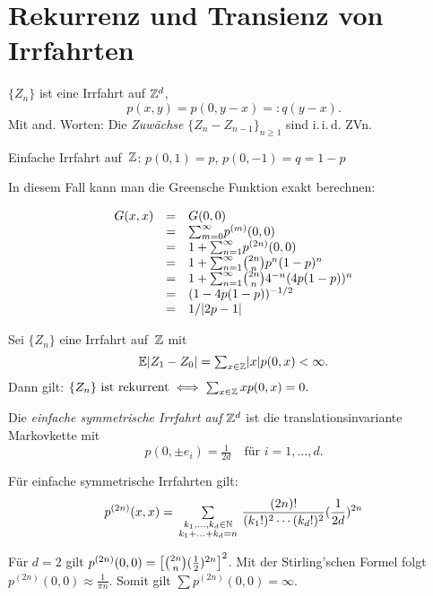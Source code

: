 \documentclass{cheat-sheet}
\newcommand{\E}{\mathbb{E}} %
\newcommand{\iid}{i.\,i.\,d.} %
\begin{document}
\section{Rekurrenz und Transienz von Irrfahrten}

\begin{situation}
  $\{ Z_n \}$ ist eine Irrfahrt auf $\mathbb{Z}^d$, \dh{}
  \[ p(x, y) = p(0, y - x) =: q(y - x). \]
  Mit and. Worten: Die \textit{Zuwächse} $\{ Z_n - Z_{n-1} \}_{n \geq 1}$ sind \iid{} ZVn.
\end{situation}

\begin{bsp}
  Einfache Irrfahrt auf~$\mathbb{Z}$: \quad
  $p(0, 1) = p$, $p(0, -1) = q = 1 - p$
\end{bsp}


In diesem Fall kann man die Greensche Funktion exakt berechnen:

\[
  \begin{array}{r c l}
    G(x, x) &=& G(0,0) \\
    &=& {\sum}_{m=0}^\infty p^{(m)}(0, 0) \\
    &=& 1 + {\sum}_{n=1}^\infty p^{(2n)}(0, 0) \\
    &=& 1 + {\sum}_{n=1}^\infty \tbinom{2n}{n} p^n (1-p)^n \\
    &=& 1 + {\sum}_{n=1}^\infty \tbinom{2n}{n} 4^{-n} (4 p (1-p))^n \\
    &=& (1 - 4 p (1-p))^{-1/2} \\
    &=& 1/\abs{2p - 1}
  \end{array}
\]

\begin{satz}
  Sei $\{ Z_n \}$ eine Irrfahrt auf~$\mathbb{Z}$ mit
  \[ \E \abs{Z_1 - Z_0} = {\sum}_{x \in \Z} \abs{x} p(0, x) < \infty. \]
  Dann gilt: \quad
  $
    \{ Z_n \} \text{ ist rekurrent} \iff {\sum}_{x \in \Z} \, x p(0, x) = 0.
  $
\end{satz}

\begin{defn}
  Die \emph{einfache symmetrische Irrfahrt auf $\mathbb{Z}^d$} ist die translationsinvariante Markovkette mit
  \[
    p(0, \pm e_i) = \tfrac{1}{2 d} \quad \text{für } i = 1, \ldots, d.
  \]
\end{defn}

\begin{bem}
  Für einfache symmetrische Irrfahrten gilt:
  \[
    p^{(2n)}(x, x) = \qquad \sum_{\mathclap{\substack{k_1, \ldots, k_d \in \N \\ k_1 + \ldots + k_d = n}}} \qquad \frac{(2n)!}{(k_1!)^2 \cdots (k_d!)^2} (\frac{1}{2d})^{2n}
  \]

  Für $d = 2$ gilt $p^{(2n)}(0, 0) = \left[ \tbinom{2n}{n} (\tfrac{1}{2})^{2n} \right]^2$.
  Mit der Stirling'schen Formel folgt $p^{(2n)}(0, 0) \approx \tfrac{1}{\pi n}$.
  Somit gilt $\sum p^{(2n)}(0,0) = \infty$.
\end{bem}
\end{document}
